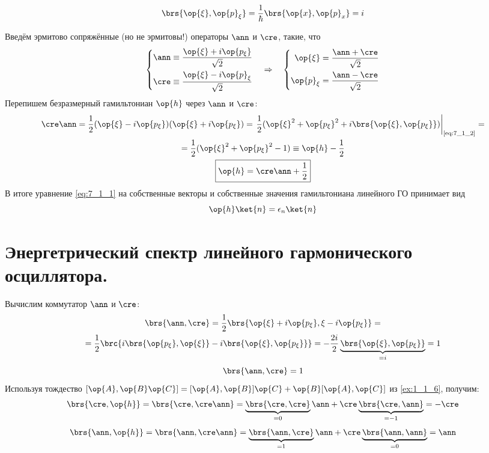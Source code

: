 \begin{equation}
\label{eq:7_1_2}
\brs{\op{\xi}, \op{p}_\xi} = \frac{1}{\hbar} \brs{\op{x}, \op{p}_x} = i
\end{equation}

Введём эрмитово сопряжённые (но не эрмитовы!) операторы $\ann$ и $\cre$, такие, что
$$
\left\{
\begin{aligned}
\ann \equiv \frac{\op{\xi} + i\op{p_\xi}}{\sqrt{2}} \\
\cre \equiv \frac{\op{\xi} - i\op{p}_\xi}{\sqrt{2}}
\end{aligned}
\right. ~~~ \Rightarrow ~~~ \left\{
\begin{aligned}
\op{\xi} = \frac{\ann + \cre}{\sqrt{2}} \\
\op{p}_\xi = \frac{\ann - \cre}{\sqrt{2}} \\
\end{aligned} \right.
$$%
%
Перепишем безразмерный гамильтониан $\op{h}$ через $\ann$ и $\cre$:
$$
\begin{gathered}
\cre\ann = \frac{1}{2} (\op{\xi} - i\op{p_\xi})(\op{\xi} + i\op{p_\xi}) = \left. \frac{1}{2}(\op{\xi}^2 + \op{p_\xi}^2 + i \brs{\op{\xi}, \op{p_\xi}}) \right|_{\text{\eqref{eq:7_1_2}}} =\\= \frac{1}{2} (\op{\xi}^2 + \op{p_\xi}^2 - 1) \equiv \op{h} - \frac{1}{2}
\\
\boxed{
  \op{h} = \cre\ann + \frac{1}{2}
}
\end{gathered}
$$%
%
В итоге уравнение \eqref{eq:7_1_1} на собственные векторы и собственные значения гамильтониана линейного ГО принимает вид
\begin{equation}
\label{eq:7_1_3}
\op{h} \ket{n} = \epsilon_n \ket{n}
\end{equation}

\section{Энергетрический спектр линейного гармонического осциллятора.}

Вычислим коммутатор $\ann$ и $\cre$:
$$
\begin{gathered}
\brs{\ann, \cre} = \frac{1}{2} \brs{ \op{\xi} + i\op{p_\xi},  \xi - i\op{p_\xi}} =\\= \frac{1}{2} \brc{ i\brs{\op{p_\xi}, \op{\xi}} - i \brs{\op{\xi}, \op{p_\xi}} } = -\frac{2i}{2} \underbrace{ \brs{\op{\xi}, \op{p_\xi}}}_{= i} = 1
\end{gathered}
$$
\begin{equation}
\label{eq:7_2_1}
\brs{\ann, \cre} = 1
\end{equation}%
%
Используя тождество $[\op{A}, \op{B}\op{C}] = [\op{A}, \op{B}] \op{C} + \op{B} [\op{A}, \op{C}]$ из \cref{ex:1_1_6}, получим:
\begin{equation}
\label{eq:7_2_2}
\brs{\cre, \op{h}} = \brs{\cre, \cre\ann} = \underbrace{\brs{\cre, \cre}}_{= 0} \ann + \cre \underbrace{\brs{\cre, \ann}}_{= -1} = - \cre
\end{equation}%
%
\begin{equation}
\label{eq:7_2_3}
\brs{\ann, \op{h}} = \brs{\ann, \cre\ann} = \underbrace{\brs{\ann, \cre}}_{= 1} \ann + \cre \underbrace{\brs{\ann, \ann}}_{= 0} = \ann
\end{equation}

